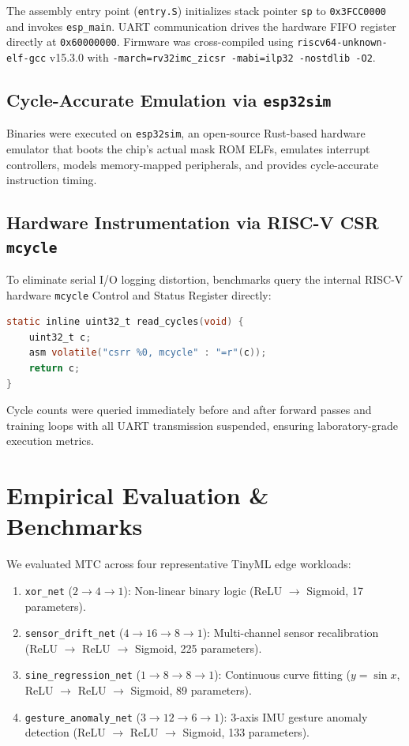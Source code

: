 \documentclass[conference]{IEEEtran}
\begin{document}
The assembly entry point (\texttt{entry.S}) initializes stack pointer \texttt{sp} to \texttt{0x3FCC0000} and invokes \texttt{esp\_main}. UART communication drives the hardware FIFO register directly at \texttt{0x60000000}. Firmware was cross-compiled using \texttt{riscv64-unknown-elf-gcc} v15.3.0 with \texttt{-march=rv32imc\_zicsr -mabi=ilp32 -nostdlib -O2}.

\subsection{Cycle-Accurate Emulation via \texttt{esp32sim}}
Binaries were executed on \texttt{esp32sim}, an open-source Rust-based hardware emulator that boots the chip's actual mask ROM ELFs, emulates interrupt controllers, models memory-mapped peripherals, and provides cycle-accurate instruction timing.

\subsection{Hardware Instrumentation via RISC-V CSR \texttt{mcycle}}
To eliminate serial I/O logging distortion, benchmarks query the internal RISC-V hardware \texttt{mcycle} Control and Status Register directly:
\begin{lstlisting}[language=C,basicstyle=\ttfamily\scriptsize]
static inline uint32_t read_cycles(void) {
    uint32_t c;
    asm volatile("csrr %0, mcycle" : "=r"(c));
    return c;
}
\end{lstlisting}
Cycle counts were queried immediately before and after forward passes and training loops with all UART transmission suspended, ensuring laboratory-grade execution metrics.

\section{Empirical Evaluation \& Benchmarks}

We evaluated MTC across four representative TinyML edge workloads:
\begin{enumerate}
    \item \texttt{xor\_net} ($2 \to 4 \to 1$): Non-linear binary logic (ReLU $\to$ Sigmoid, 17 parameters).
    \item \texttt{sensor\_drift\_net} ($4 \to 16 \to 8 \to 1$): Multi-channel sensor recalibration (ReLU $\to$ ReLU $\to$ Sigmoid, 225 parameters).
    \item \texttt{sine\_regression\_net} ($1 \to 8 \to 8 \to 1$): Continuous curve fitting ($y = \sin x$, ReLU $\to$ ReLU $\to$ Sigmoid, 89 parameters).
    \item \texttt{gesture\_anomaly\_net} ($3 \to 12 \to 6 \to 1$): 3-axis IMU gesture anomaly detection (ReLU $\to$ ReLU $\to$ Sigmoid, 133 parameters).
\end{enumerate}
\end{document}
